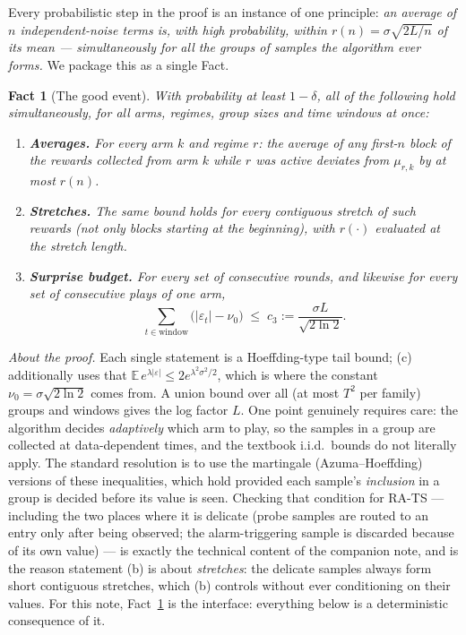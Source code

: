 \documentclass[11pt]{article}
\newtheorem{fact}{Fact}
\newcommand{\E}{\mathbb E}
\newcommand{\nun}{\nu_0}
\begin{document}
Every probabilistic step in the proof is an instance of one principle: \emph{an average of $n$ independent-noise terms is, with high probability, within $r(n)=\sigma\sqrt{2L/n}$ of its mean --- simultaneously for all the groups of samples the algorithm ever forms.} We package this as a single Fact.

\begin{fact}[The good event]
\label{fact:conc}
With probability at least $1-\delta$, all of the following hold simultaneously, for all arms, regimes, group sizes and time windows at once:
\begin{enumerate}[leftmargin=1.6em,label=(\alph*)]
\item \textbf{Averages.} For every arm $k$ and regime $r$: the average of any first-$n$ block of the rewards collected from arm $k$ while $r$ was active deviates from $\mu_{r,k}$ by at most $r(n)$.
\item \textbf{Stretches.} The same bound holds for every \emph{contiguous stretch} of such rewards (not only blocks starting at the beginning), with $r(\cdot)$ evaluated at the stretch length.
\item \textbf{Surprise budget.} For every set of consecutive rounds, and likewise for every set of consecutive plays of one arm,
\[
    \sum_{t\in\text{window}}\bigl(|\varepsilon_t|-\nun\bigr)\;\le\;c_3:=\frac{\sigma L}{\sqrt{2\ln2}} .
\]
\end{enumerate}
\end{fact}

\noindent\emph{About the proof.} Each single statement is a Hoeffding-type tail bound; (c) additionally uses that $\E\,e^{\lambda|\varepsilon|}\le2e^{\lambda^2\sigma^2/2}$, which is where the constant $\nun=\sigma\sqrt{2\ln2}$ comes from. A union bound over all (at most $T^2$ per family) groups and windows gives the log factor $L$. One point genuinely requires care: the algorithm decides \emph{adaptively} which arm to play, so the samples in a group are collected at data-dependent times, and the textbook i.i.d.\ bounds do not literally apply. The standard resolution is to use the martingale (Azuma--Hoeffding) versions of these inequalities, which hold provided each sample's \emph{inclusion} in a group is decided before its value is seen. Checking that condition for RA-TS --- including the two places where it is delicate (probe samples are routed to an entry only after being observed; the alarm-triggering sample is discarded because of its own value) --- is exactly the technical content of the companion note, and is the reason statement (b) is about \emph{stretches}: the delicate samples always form short contiguous stretches, which (b) controls without ever conditioning on their values. For this note, Fact~\ref{fact:conc} is the interface: everything below is a deterministic consequence of it.
\end{document}
